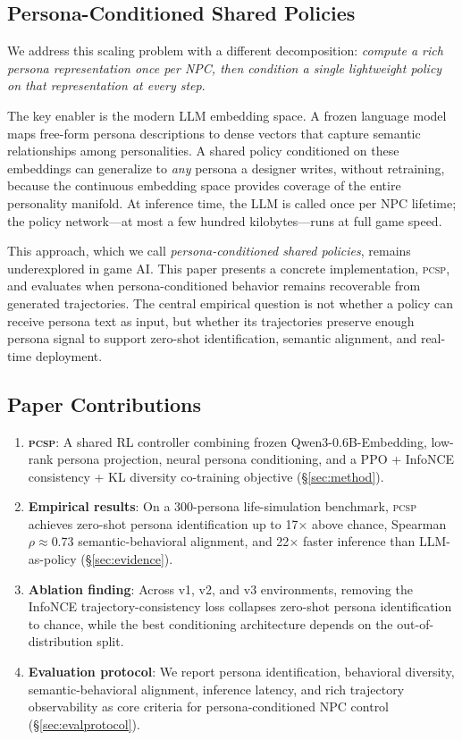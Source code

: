 \documentclass[conference]{IEEEtran}
\newcommand{\PCSP}{\textsc{pcsp}\xspace}
\begin{document}
\subsection{Persona-Conditioned Shared Policies}

We address this scaling problem with a different decomposition: \emph{compute a
rich persona representation once per NPC, then condition a single lightweight
policy on that representation at every step}.

The key enabler is the modern LLM embedding space. A frozen language model maps
free-form persona descriptions to dense vectors that capture semantic
relationships among personalities. A shared policy conditioned on these
embeddings can generalize to \emph{any} persona a designer writes, without
retraining, because the continuous embedding space provides coverage of the
entire personality manifold. At inference time, the LLM is called once per NPC
lifetime; the policy network---at most a few hundred kilobytes---runs at full
game speed.

This approach, which we call \emph{persona-conditioned shared
policies}, remains underexplored in game AI. This paper presents a concrete
implementation, \PCSP, and evaluates when persona-conditioned behavior remains
recoverable from generated trajectories. The central empirical question is not
whether a policy can receive persona text as input, but whether its trajectories
preserve enough persona signal to support zero-shot identification, semantic
alignment, and real-time deployment.

\subsection{Paper Contributions}

\begin{enumerate}
  \setlength\itemsep{2pt}
  \item \textbf{\PCSP}: A shared RL controller combining frozen
    Qwen3-0.6B-Embedding, low-rank persona projection, neural persona conditioning, and a
    PPO + InfoNCE consistency + KL diversity co-training objective
    (\S\ref{sec:method}).
  \item \textbf{Empirical results}: On a 300-persona life-simulation benchmark,
    \PCSP achieves zero-shot persona identification up to 17$\times$ above
    chance, Spearman $\rho\!\approx\!0.73$ semantic-behavioral alignment, and
    22$\times$ faster inference than LLM-as-policy (\S\ref{sec:evidence}).
  \item \textbf{Ablation finding}: Across v1, v2, and v3 environments, removing
    the InfoNCE trajectory-consistency loss collapses zero-shot persona
    identification to chance, while the best conditioning architecture depends
    on the out-of-distribution split.
  \item \textbf{Evaluation protocol}: We report persona identification,
    behavioral diversity, semantic-behavioral alignment, inference latency, and
    rich trajectory observability as core criteria for persona-conditioned NPC
    control (\S\ref{sec:evalprotocol}).
\end{enumerate}
\end{document}
